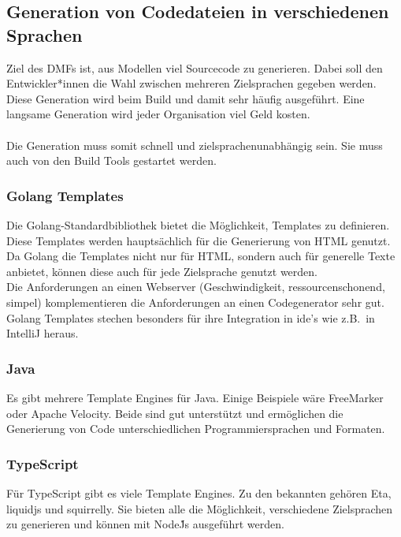 \documentclass[./einleitung.tex]{subfiles}
\begin{document}
\subsection{Generation von Codedateien in verschiedenen Sprachen}
Ziel des DMFs ist, aus Modellen viel Sourcecode zu generieren.
Dabei soll den Entwickler*innen die Wahl zwischen mehreren Zielsprachen gegeben werden.
Diese Generation wird beim Build und damit sehr häufig ausgeführt.
Eine langsame Generation wird jeder Organisation viel Geld kosten.
\\\\
Die Generation muss somit schnell und zielsprachenunabhängig sein.
Sie muss auch von den Build Tools gestartet werden.

\subsubsection{Golang Templates}
Die Golang-Standardbibliothek bietet die Möglichkeit, Templates zu definieren.
Diese Templates werden hauptsächlich für die Generierung von HTML genutzt.
Da Golang die Templates nicht nur für HTML, sondern auch für generelle Texte anbietet, können diese auch für jede Zielsprache genutzt werden. \\
Die Anforderungen an einen Webserver (Geschwindigkeit, ressourcenschonend, simpel) komplementieren die Anforderungen an einen Codegenerator sehr gut. \\
Golang Templates stechen besonders für ihre Integration in \acrshort{ide}'s wie z.B.\ in IntelliJ heraus.

\subsubsection{Java}
Es gibt mehrere Template Engines für Java.
Einige Beispiele wäre FreeMarker oder Apache Velocity.
Beide sind gut unterstützt und ermöglichen die Generierung von Code unterschiedlichen Programmiersprachen und Formaten.

\subsubsection{TypeScript}
Für TypeScript gibt es viele Template Engines.
Zu den bekannten gehören Eta, liquidjs und squirrelly.
Sie bieten alle die Möglichkeit, verschiedene Zielsprachen zu generieren und können mit Node\.Js ausgeführt werden.
\end{document}
